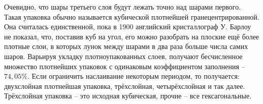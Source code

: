 Очевидно, что шары третьего слоя будут лежать точно над шарами первого. Такая упаковка обычно называется кубической плотнейшей гранецентрированной. Она считалась единственной, пока в 1900 английский кристаллограф У. Барлоу не показал, что, поставив куб на угол, его можно разобрать на плоские ещё более плотные слои, в которых лунок между шарами в два раза больше числа самих шаров. Варьируя укладку плотноупакованных слоев, получают бесчисленное множество плотнейших упаковок с одинаковым коэффициентом заполнения – $74,05\%$. Если ограничить наслаивание некоторым периодом, то получается: двухслойная плотнейшая упаковка, трёхслойная, четырёхслойная и так далее. Трёхслойная упаковка – это исходная кубическая, прочие – все гексагональные.


